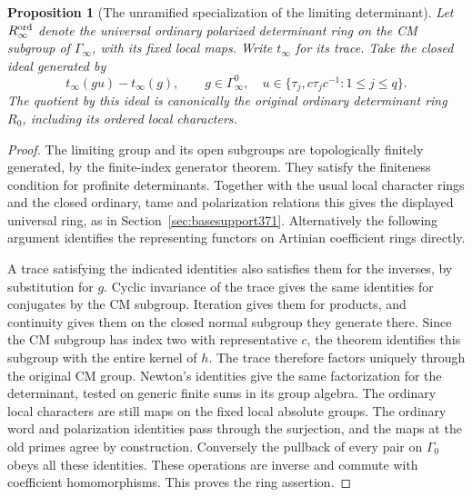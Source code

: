 \documentclass[a4paper,11pt]{article}
\newtheorem{proposition}{Proposition}[section]
\theoremstyle{definition}
\theoremstyle{remark}
\numberwithin{equation}{section}
\begin{document}
\begin{proposition}[The unramified specialization of the limiting determinant]\leavevmode
\label{prop:unramifiedlimit407}
Let \(R_\infty^{\rm ord}\) denote the universal ordinary
polarized determinant ring on the CM subgroup of
\(\Gamma_\infty\), with its fixed local maps. Write
\(t_\infty\) for its trace. Take the closed ideal generated by
\[
    t_\infty(gu)-t_\infty(g),\qquad
    g\in\Gamma_\infty^0,\quad
    u\in\{\tau_j,c\tau_jc^{-1}:1\le j\le q\}.
\]
The quotient by this ideal is canonically the original
ordinary determinant ring \(R_0\), including its ordered
local characters.
\end{proposition}
\begin{proof}
The limiting group and its open subgroups are topologically
finitely generated, by the finite-index generator theorem.
They satisfy the finiteness condition for profinite
determinants. Together with the usual local character rings
and the closed ordinary, tame and polarization relations
this gives the displayed universal ring, as in
Section~\ref{sec:basesupport371}. Alternatively the following
argument identifies the representing functors on Artinian
coefficient rings directly. \cite{VIII-VI-chenevier364}

A trace satisfying the indicated identities also satisfies
them for the inverses, by substitution for \(g\). Cyclic
invariance of the trace gives the same identities for
conjugates by the CM subgroup. Iteration gives them for
products, and continuity gives them on the closed normal
subgroup they generate there. Since the CM subgroup has
index two with representative \(c\), the theorem identifies
this subgroup with the entire kernel of \(h\). The trace
therefore factors uniquely through the original CM group.
Newton's identities give the same factorization for the
determinant, tested on generic finite sums in its group
algebra. The ordinary local characters are still maps on
the fixed local absolute groups. The ordinary word and
polarization identities pass through the surjection, and
the maps at the old primes agree by construction. Conversely
the pullback of every pair on \(\Gamma_0\) obeys all these
identities. These operations are inverse and commute with
coefficient homomorphisms. This proves the ring assertion.
\end{proof}
\end{document}
